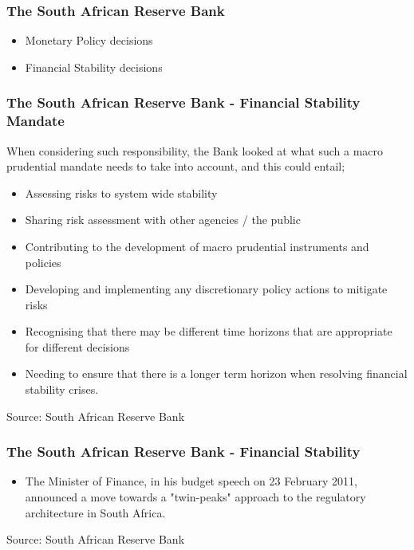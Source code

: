 \documentclass[11pt]{beamer}
\begin{document}
\begin{frame}
\frametitle{The South African Reserve Bank}
\begin{itemize}
\item Monetary Policy decisions
\item Financial Stability decisions
\end{itemize}
\end{frame}


\begin{frame}
\frametitle{The South African Reserve Bank - Financial Stability Mandate}
When considering such responsibility, the Bank looked at what such a macro prudential mandate needs to take into account, and this could entail;
\begin{itemize}
\item Assessing risks to system wide stability
\item Sharing risk assessment with other agencies / the public
\item Contributing to the development of macro prudential instruments and policies
\item Developing and implementing any discretionary policy actions to mitigate risks
\item Recognising that there may be different time horizons that are appropriate for different decisions
\item Needing to ensure that there is a longer term horizon when resolving financial stability crises.
\end{itemize}
\tiny{Source: South African Reserve Bank}
\end{frame}

\begin{frame}
\frametitle{The South African Reserve Bank - Financial Stability}
\begin{itemize}
\item The Minister of Finance, in his budget speech on 23 February 2011, announced a move towards a "twin-peaks" approach to the regulatory architecture in South Africa.
\end{itemize}
\tiny{Source: South African Reserve Bank}
\end{frame}
\end{document}
